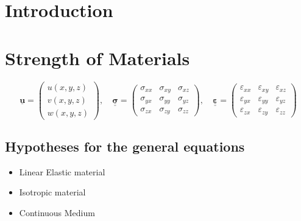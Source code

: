 \documentclass[12pt]{article}
\begin{document}



\renewcommand{\contentsname}{Table of Content}

\tableofcontents
\newpage
\listoffigures
\newpage
\listoftables
\newpage

\section{Introduction}



\section{Strength of Materials}



\begin{equation}
\underline{\mathbf{u}} =
\begin{pmatrix}
    u(x,y,z) \\
    v(x,y,z) \\
    w(x,y,z)
\end{pmatrix}, \quad
\underline{\underline{\boldsymbol{\sigma}}} =
\begin{pmatrix}
    \sigma_{xx} & \sigma_{xy} & \sigma_{xz} \\
    \sigma_{yx} & \sigma_{yy} & \sigma_{yz} \\
    \sigma_{zx} & \sigma_{zy} & \sigma_{zz}
\end{pmatrix}, \quad
\underline{\underline{\boldsymbol{\varepsilon}}} =
\begin{pmatrix}
    \varepsilon_{xx} & \varepsilon_{xy} & \varepsilon_{xz} \\
    \varepsilon_{yx} & \varepsilon_{yy} & \varepsilon_{yz} \\
    \varepsilon_{zx} & \varepsilon_{zy} & \varepsilon_{zz}
\end{pmatrix}
\end{equation}

\subsection{Hypotheses for the general equations} \label{sec: SoM general hyp}
\begin{itemize}
    \item Linear Elastic material
    \item Isotropic material
    \item Continuous Medium
\end{itemize}
\end{document}
